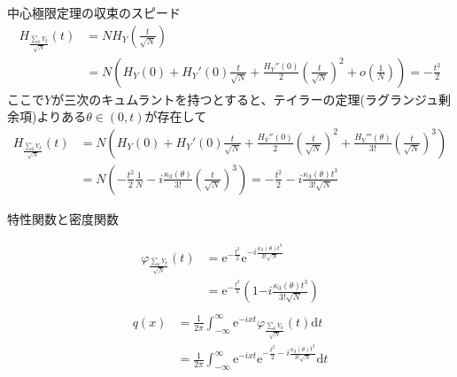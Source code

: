 \documentclass[lualatex,handout]{beamer}
\theoremstyle{definition}
\begin{document}
\begin{frame}{中心極限定理の収束のスピード}
\begin{align*}
H_{\frac{\sum_kY_k}{\sqrt{N}}}(t) &= 
NH_Y\left(\frac{t}{\sqrt{N}}\right)\\
&=N\left(H_Y(0) + H_Y'(0)\frac{t}{\sqrt{N}} + \frac{H_Y''(0)}2\left(\frac{t}{\sqrt{N}}\right)^2 + o\left(\frac{1}{N}\right)\right)
= -\frac{t^2}2
\end{align*}
ここで$Y$が三次のキュムラントを持つとすると、テイラーの定理(ラグランジュ剰余項)よりある$\theta\in(0,t)$が存在して
\begin{align*}
H_{\frac{\sum_kY_k}{\sqrt{N}}}(t) &= 
N\left(H_Y(0) + H_Y'(0)\frac{t}{\sqrt{N}} + \frac{H_Y''(0)}2\left(\frac{t}{\sqrt{N}}\right)^2 + \frac{H_Y'''(\theta)}{3!} \left(\frac{t}{\sqrt{N}}\right)^3\right)\\
&=N\left(-\frac{t^2}2\frac1N - i\frac{\kappa_3(\theta)}{3!} \left(\frac{t}{\sqrt{N}}\right)^3\right)
=-\frac{t^2}2 - i\frac{\kappa_3(\theta)t^3}{3!\sqrt{N}}
\end{align*}
\end{frame}

\begin{frame}{特性関数と密度関数}

\begin{align*}
\varphi_{\frac{\sum_kY_k}{\sqrt{N}}}(t)
 &= \mathrm{e}^{-\frac{t^2}2}\mathrm{e}^{-i\frac{\kappa_3(\theta)t^3}{3!\sqrt{N}}}\\
 &= \mathrm{e}^{-\frac{t^2}2}\left(1 {-i\frac{\kappa_3(\theta)t^3}{3!\sqrt{N}}}\right)\\
\end{align*}
\begin{align*}
q(x) &= \frac1{2\pi}\int_{-\infty}^\infty \mathrm{e}^{-ixt} \varphi_{\frac{\sum_kY_k}{\sqrt{N}}}(t)\mathrm{d}t\\
&= \frac1{2\pi}\int_{-\infty}^\infty \mathrm{e}^{-ixt} \mathrm{e}^{-\frac{t^2}2 - i\frac{\kappa_3(\theta)t^3}{3!\sqrt{N}}}\mathrm{d}t
\end{align*}
\end{frame}
\fi
\end{document}
